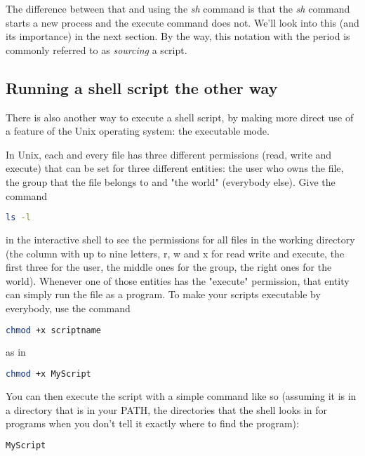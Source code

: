 The difference between that and using the \textit{sh} command is that the
\textit{sh} command starts a new process and the execute command does not.
We'll look into this (and its importance) in the next section. By the way, this
notation with the period is commonly referred to as \textit{sourcing} a script.

\subsection{Running a shell script the other way}
There is also another way to execute a shell script, by making more direct use
of a feature of the Unix operating system: the executable mode.

In Unix, each and every file has three different permissions (read, write and
execute) that can be set for three different entities: the user who owns the
file, the group that the file belongs to and "the world" (everybody else). Give
the command
\lstset{basicstyle=\scriptsize, numbers=left, captionpos=b, tabsize=4}
\begin{lstlisting}[language={bash},
xleftmargin=15pt]
ls -l
\end{lstlisting}

in the interactive shell to see the permissions for all files in the working
directory (the column with up to nine letters, r, w and x for read write and
execute, the first three for the user, the middle ones for the group, the right
ones for the world). Whenever one of those entities has the "execute"
permission, that entity can simply run the file as a program. To make your
scripts executable by everybody, use the command
\lstset{basicstyle=\scriptsize, numbers=left, captionpos=b, tabsize=4}
\begin{lstlisting}[language={bash},
xleftmargin=15pt]
chmod +x scriptname
\end{lstlisting}

as in 
\lstset{basicstyle=\scriptsize, numbers=left, captionpos=b, tabsize=4}
\begin{lstlisting}[caption=Making MyScript executable,language={bash},
xleftmargin=15pt, label=lst:Making MyScript executable]
chmod +x MyScript
\end{lstlisting}

You can then execute the script with a simple command like so (assuming it is
in a directory that is in your PATH, the directories that the shell looks in
for programs when you don't tell it exactly where to find the program):
\lstset{basicstyle=\scriptsize, numbers=left, captionpos=b, tabsize=4}
\begin{lstlisting}[caption=Running a command in a new shell,language={bash},
xleftmargin=15pt, label=lst:Running a command in a new shell]
MyScript
\end{lstlisting}

